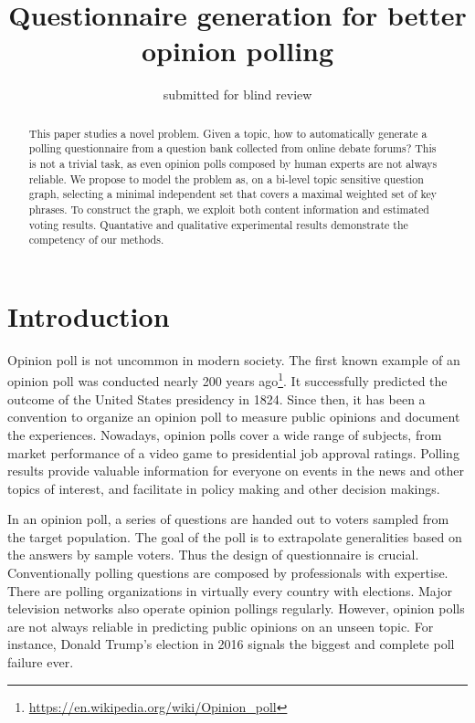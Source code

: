 \documentclass{llncs}
\begin{document}
\title{Questionnaire generation for better opinion polling}

\author{submitted for blind review}

\maketitle









\begin{abstract}

This paper studies a novel problem. Given a topic, how to automatically generate a polling questionnaire from a question bank collected from online debate forums? This is not a trivial task, as even opinion polls composed by human experts are not always reliable. We propose to model the problem as, on a bi-level topic sensitive question graph, selecting a minimal independent set that covers a maximal weighted set of key phrases. To construct the graph, we exploit both content information and estimated voting results. Quantative and qualitative experimental results demonstrate the competency of our methods.
\end{abstract}






\section{Introduction}\label{sec:intro}

Opinion poll is not uncommon in modern society. The first known example of an opinion poll was conducted nearly 200 years ago\footnote{\url{https://en.wikipedia.org/wiki/Opinion_poll}}. It successfully predicted the outcome of the United States presidency in 1824. Since then, it has been a convention to organize an opinion poll to measure public opinions and document the experiences. Nowadays, opinion polls cover a wide range of subjects, from market performance of a video game to presidential job approval ratings. Polling results provide valuable information for everyone on events in the news and other topics of interest, and facilitate in policy making and other decision makings.

In an opinion poll, a series of questions are handed out to voters sampled from the target population. The goal of the poll is to extrapolate generalities based on the answers by sample voters. Thus the design of questionnaire is crucial. Conventionally polling questions are composed by professionals with expertise. There are polling organizations in virtually every country with elections. Major television networks also operate opinion pollings regularly. However, opinion polls are not always reliable in predicting public opinions on an unseen topic. For instance, Donald Trump's election in 2016 signals the biggest and complete poll failure ever.
\end{document}
